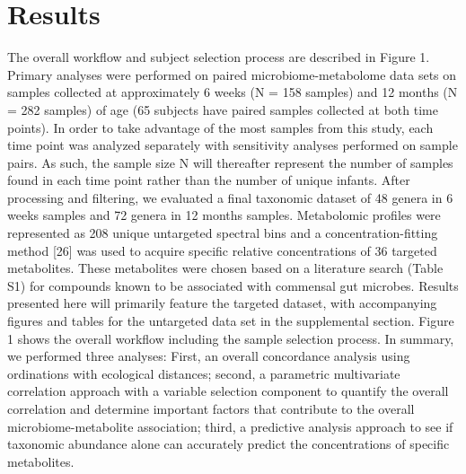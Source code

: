 \section{Results} 
The overall workflow and subject selection process are described in Figure 1. Primary analyses were performed on paired microbiome-metabolome data sets on samples collected at approximately 6 weeks (N = 158 samples) and 12 months (N = 282 samples) of age (65 subjects have paired samples collected at both time points). In order to take advantage of the most samples from this study, each time point was analyzed separately with sensitivity analyses performed on sample pairs. As such, the sample size N will thereafter represent the number of samples found in each time point rather than the number of unique infants. After processing and filtering, we evaluated a final taxonomic dataset of 48 genera in 6 weeks samples and 72 genera in 12 months samples.  Metabolomic profiles were represented as 208 unique untargeted spectral bins and a concentration-fitting method [26] was used to acquire specific relative concentrations of 36 targeted metabolites. These metabolites were chosen based on a literature search (Table S1) for compounds known to be associated with commensal gut microbes. Results presented here will primarily feature the targeted dataset, with accompanying figures and tables for the untargeted data set in the supplemental section. Figure 1 shows the overall workflow including the sample selection process. In summary, we performed three analyses: First, an overall concordance analysis using ordinations with ecological distances; second, a parametric multivariate correlation approach with a variable selection component to quantify the overall correlation and determine important factors that contribute to the overall microbiome-metabolite association; third, a predictive analysis approach to see if taxonomic abundance alone can accurately predict the concentrations of specific metabolites.  
